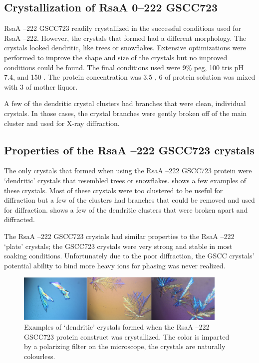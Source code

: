\subsection{Crystallization of RsaA \del{}0--222 GSCC723} \label{sec:cryst-rsaa-del0}

RsaA --222 GSCC723 readily crystallized in the successful conditions used for RsaA --222. However, the crystals that formed had a different morphology. The crystals looked dendritic, like trees or snowflakes. Extensive optimizations were performed to improve the shape and size of the crystals but no improved conditions could be found. The final conditions used were 9\% \ac{peg}, 100 \millimolar{} tris pH 7.4, and 150 \millimolar{} . The protein concentration was 3.5 \mgperml{}, 6 \microlitre{} of protein solution was mixed with 3 \microlitre{} of mother liquor. 

A few of the dendritic crystal clusters had branches that were clean, individual crystals. In those cases, the crystal branches were gently broken off of the main cluster and used for X-ray diffraction.

\subsection{Properties of the RsaA --222 GSCC723 crystals}\label{sec:properties-rsaa-del}
The only crystals that formed when using the RsaA --222 GSCC723 protein were `dendritic' crystals that resembled trees or snowflakes.  shows a few examples of these crystals. Most of these crystals were too clustered to be useful for diffraction but a few of the clusters had branches that could be removed and used for diffraction.  shows a few of the dendritic clusters that were broken apart and diffracted. 

The RsaA --222 GSCC723 crystals had similar properties to the RsaA --222 `plate' crystals; the GSCC723 crystals were very strong and stable in
most soaking conditions. Unfortunately due to the poor diffraction, the GSCC
crystals' potential ability to bind more heavy ions for phasing was never realized.

\begin{figure}[htb]
  	\begin{center}
   		\includegraphics[width=0.9\textwidth]{crystal_chapter/img/dendroXtals.jpg}
   	\end{center}
   	\caption[Examples of unusable `dendritic' RsaA --222 GSCC723 crystals]{Examples of `dendritic' crystals formed when the RsaA --222 GSCC723 protein construct was crystallized. The color is imparted by a polarizing filter on the microscope, the crystals are naturally colourless.}
   	\label{fig:crystal-dendrites}
\end{figure}

